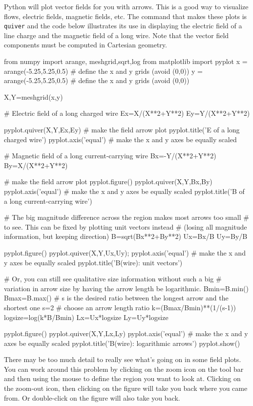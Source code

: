 Python will plot vector fields for you with arrows. This is a good
way to visualize flows, electric fields, magnetic fields, etc. The
command that makes these plots is {\tt quiver} and the code below
illustrates its use in displaying the electric field of a line
charge and the magnetic field of a long wire.  Note that the vector
field components must be computed in Cartesian geometry.
\begin{codeexample}
\begin{VerbatimOut}{\listingFile}
from numpy import arange, meshgrid,sqrt,log
from matplotlib import pyplot
x = arange(-5.25,5.25,0.5) # define the x and y grids (avoid (0,0))
y = arange(-5.25,5.25,0.5) # define the x and y grids (avoid (0,0))

X,Y=meshgrid(x,y)

# Electric field of a long charged wire
Ex=X/(X**2+Y**2)
Ey=Y/(X**2+Y**2)

pyplot.quiver(X,Y,Ex,Ey) # make the field arrow plot
pyplot.title('E of a long charged wire')
pyplot.axis('equal')  # make the x and y axes be equally scaled

# Magnetic field of a long current-carrying wire
Bx=-Y/(X**2+Y**2)
By=X/(X**2+Y**2)

# make the field arrow plot
pyplot.figure()
pyplot.quiver(X,Y,Bx,By)
pyplot.axis('equal')  # make the x and y axes be equally scaled
pyplot.title('B of a long current-carrying wire')

# The big magnitude difference across the region makes most arrows too small
# to see.  This can be fixed by plotting unit vectors instead
# (losing all magnitude information, but keeping direction)
B=sqrt(Bx**2+By**2)
Ux=Bx/B
Uy=By/B

pyplot.figure()
pyplot.quiver(X,Y,Ux,Uy);
pyplot.axis('equal')  # make the x and y axes be equally scaled
pyplot.title('B(wire): unit vectors')

# Or, you can still see qualitative size information without such a big
# variation in arrow size by having the arrow length be logarithmic.
Bmin=B.min()
Bmax=B.max()
# s is the desired ratio between the longest arrow and the shortest one
s=2  # choose an arrow length ratio
k=(Bmax/Bmin)**(1/(s-1))
logsize=log(k*B/Bmin)
Lx=Ux*logsize
Ly=Uy*logsize

pyplot.figure()
pyplot.quiver(X,Y,Lx,Ly)
pyplot.axis('equal')  # make the x and y axes be equally scaled
pyplot.title('B(wire): logarithmic arrows')
pyplot.show()
\end{VerbatimOut}
\end{codeexample}
 There may be too much detail to really see
what's going on in some field plots. You can work around this
problem by clicking on the zoom icon on the tool bar and then using
the mouse to define the region you want to look at. Clicking on the
zoom-out icon, then clicking on the figure will take you back where
you came from. Or double-click on the figure will also take you
back.

